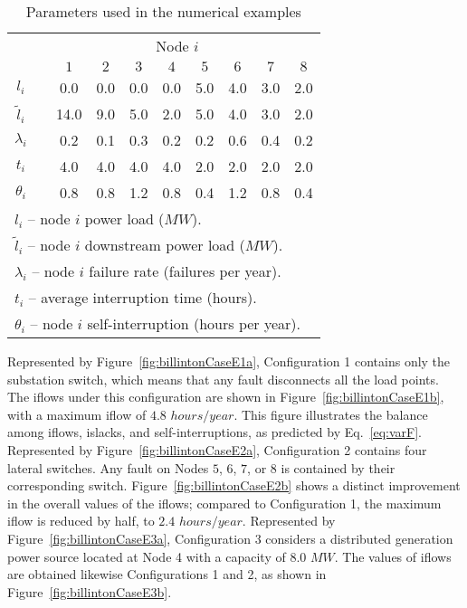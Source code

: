 \documentclass{article}
\begin{document}
\begin{table}[ht!]
\setlength{\tabcolsep}{6pt}
\caption{Parameters used in the numerical examples} \begin{center} {
\begin{tabular}{ c c c c c c c c c c } \label{tbl:billintonParameters}
\\ \hline
 &  \multicolumn{9}{c}{Node $i$} \\
 &  & $1$ & $2$ & $3$ & $4$ & $5$ & $6$ & $7$ & $8$ \\ \cline{3-10}
$l_i$ &  & 0.0 & 0.0 & 0.0 & 0.0 & 5.0 & 4.0 & 3.0 & 2.0 \\ 
$\tilde{l}_i$ &  & 14.0 & 9.0 & 5.0 & 2.0 & 5.0 & 4.0 & 3.0 & 2.0 \\ 
$\lambda_i$ &  & 0.2 & 0.1 & 0.3 & 0.2 & 0.2 & 0.6 & 0.4 & 0.2 \\ 
$t_i$ &  & 4.0 & 4.0 & 4.0 & 4.0 & 2.0 & 2.0 & 2.0 & 2.0 \\ 
$\theta_i$ &  & 0.8 & 0.8 & 1.2 & 0.8 & 0.4 & 1.2 & 0.8 & 0.4 \\ 
\hline
\multicolumn{10}{l}{$l_i$ -- node $i$ power load ($MW$).} \\
\multicolumn{10}{l}{$\tilde{l}_i$ -- node $i$ downstream power load ($MW$).} \\
\multicolumn{10}{l}{$\lambda_i$ -- node $i$ failure rate (failures per year).} \\
\multicolumn{10}{l}{$t_i$ -- average interruption time (hours).} \\
\multicolumn{10}{l}{$\theta_i$ -- node $i$ self-interruption (hours per year).} \\
\end{tabular} } 
\end{center} \end{table}

Represented by Figure~\ref{fig:billintonCaseE1a}, Configuration 1 contains only the substation switch, which means that any fault  disconnects all the load points. The iflows under this configuration are shown in Figure~\ref{fig:billintonCaseE1b}, with a maximum iflow of $4.8$ $hours/year$. This figure  illustrates the balance among iflows, islacks, and self-interruptions, as predicted by Eq.~\eqref{eq:varF}.
Represented by Figure~\ref{fig:billintonCaseE2a}, Configuration 2 contains four lateral switches. Any fault on Nodes $5$, $6$, $7$, or $8$ is contained by their corresponding switch. Figure~\ref{fig:billintonCaseE2b} shows a distinct improvement  in the overall values of the iflows; compared to Configuration 1, the maximum iflow is reduced by half, to $2.4$ $hours/year$.
Represented by Figure~\ref{fig:billintonCaseE3a}, Configuration 3 considers a distributed generation power source located at Node 4 with a capacity of $8.0$ $MW$. The values of iflows are obtained likewise Configurations 1 and 2, as shown in Figure~\ref{fig:billintonCaseE3b}. 
\end{document}
